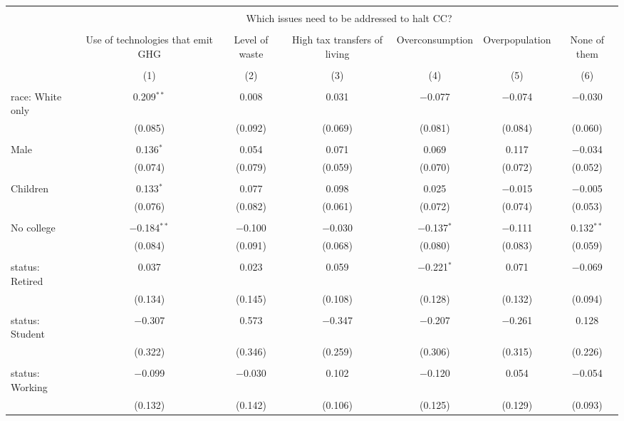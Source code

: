
\begin{tabular}{@{\extracolsep{5pt}}lcccccc} 
\\[-1.8ex]\hline 
\hline \\[-1.8ex] 
 & \multicolumn{6}{c}{Which issues need to be addressed to halt CC?} \\ 
\cline{2-7} 
\\[-1.8ex] & Use of technologies that emit GHG & Level of waste & High tax transfers of living & Overconsumption & Overpopulation & None of them \\ 
\\[-1.8ex] & (1) & (2) & (3) & (4) & (5) & (6)\\ 
\hline \\[-1.8ex] 
 race: White only & 0.209$^{**}$ & 0.008 & 0.031 & $-$0.077 & $-$0.074 & $-$0.030 \\ 
  & (0.085) & (0.092) & (0.069) & (0.081) & (0.084) & (0.060) \\ 
  & & & & & & \\ 
 Male & 0.136$^{*}$ & 0.054 & 0.071 & 0.069 & 0.117 & $-$0.034 \\ 
  & (0.074) & (0.079) & (0.059) & (0.070) & (0.072) & (0.052) \\ 
  & & & & & & \\ 
 Children & 0.133$^{*}$ & 0.077 & 0.098 & 0.025 & $-$0.015 & $-$0.005 \\ 
  & (0.076) & (0.082) & (0.061) & (0.072) & (0.074) & (0.053) \\ 
  & & & & & & \\ 
 No college & $-$0.184$^{**}$ & $-$0.100 & $-$0.030 & $-$0.137$^{*}$ & $-$0.111 & 0.132$^{**}$ \\ 
  & (0.084) & (0.091) & (0.068) & (0.080) & (0.083) & (0.059) \\ 
  & & & & & & \\ 
 status: Retired & 0.037 & 0.023 & 0.059 & $-$0.221$^{*}$ & 0.071 & $-$0.069 \\ 
  & (0.134) & (0.145) & (0.108) & (0.128) & (0.132) & (0.094) \\ 
  & & & & & & \\ 
 status: Student & $-$0.307 & 0.573 & $-$0.347 & $-$0.207 & $-$0.261 & 0.128 \\ 
  & (0.322) & (0.346) & (0.259) & (0.306) & (0.315) & (0.226) \\ 
  & & & & & & \\ 
 status: Working & $-$0.099 & $-$0.030 & 0.102 & $-$0.120 & 0.054 & $-$0.054 \\ 
  & (0.132) & (0.142) & (0.106) & (0.125) & (0.129) & (0.093) \\ 

\end{tabular}
